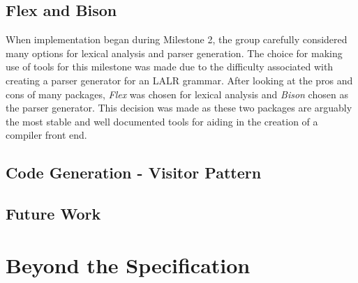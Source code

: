 \documentclass[a4wide, 11pt]{article}
\begin{document}
\subsection{Flex and Bison}

When implementation began during Milestone 2, the group carefully considered
many options for lexical analysis and parser generation. The choice for making 
use of tools for this milestone was made due to the difficulty associated with
creating a parser generator for an LALR grammar. After looking at the
pros and cons of many packages, \emph{Flex} was chosen for lexical analysis
and \emph{Bison} chosen as the parser generator. This decision was made as 
these two packages are arguably the most stable and well documented tools for 
aiding in the creation of a compiler front end.

\subsection{Code Generation - Visitor Pattern}



\subsection{Future Work}

\section{Beyond the Specification}

\enddocument
\end{document}
